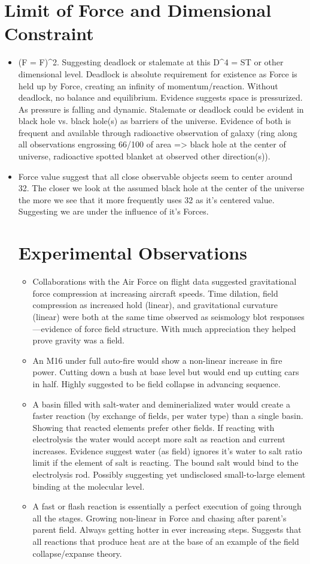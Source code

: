 \documentclass[12pt]{thesis}
\begin{document}
\section{Limit of Force and Dimensional Constraint}
\begin{itemize}
	\item (F = F)^2. Suggesting deadlock or stalemate at this D^4 = ST or other dimensional level. Deadlock is absolute requirement for existence as Force is held up by Force, creating an infinity of momentum/reaction. Without deadlock, no balance and equilibrium. Evidence suggests space is pressurized. As pressure is falling and dynamic. Stalemate or deadlock could be evident in black hole vs. black hole(s) as barriers of the universe. Evidence of both is frequent and available through radioactive observation of galaxy (ring along all observations engrossing 66/100 of area => black hole at the center of universe, radioactive spotted blanket at observed other direction(s)).
	
	\item Force value suggest that all close observable objects seem to center around 32. The closer we look at the assumed black hole at the center of the universe the more we see that it more frequently uses 32 as it's centered value. Suggesting we are under the influence of it's Forces.  
	

\section{Experimental Observations}
\begin{itemize}
\item Collaborations with the Air Force on flight data suggested gravitational force compression at increasing aircraft speeds. Time dilation, field compression as increased hold (linear), and gravitational curvature (linear) were both at the same time observed as seismology blot responses—evidence of force field structure. With much appreciation they helped prove gravity was a field.
\item An M16 under full auto-fire would show a non-linear increase in fire power. Cutting down a bush at base level but would end up cutting cars in half. Highly suggested to be field collapse in advancing sequence.
\item A basin filled with salt-water and deminerialized water would create a faster reaction (by exchange of fields, per water type) than a single basin. Showing that reacted elements prefer other fields. If reacting with electrolysis the water would accept more salt as reaction and current increases. Evidence suggest water (as field) ignores it's water to salt ratio limit if the element of salt is reacting. The bound salt would bind to the electrolysis rod. Possibly suggesting yet undisclosed small-to-large element binding at the molecular level.
\item A fast or flash reaction is essentially a perfect execution of going through all the stages. Growing non-linear in Force and chasing after parent's parent field. Always getting hotter in ever increasing steps. Suggests that all reactions that produce heat are at the base of an example of the field collapse/expanse theory.


\end{itemize}
\end{itemize}
\end{document}
